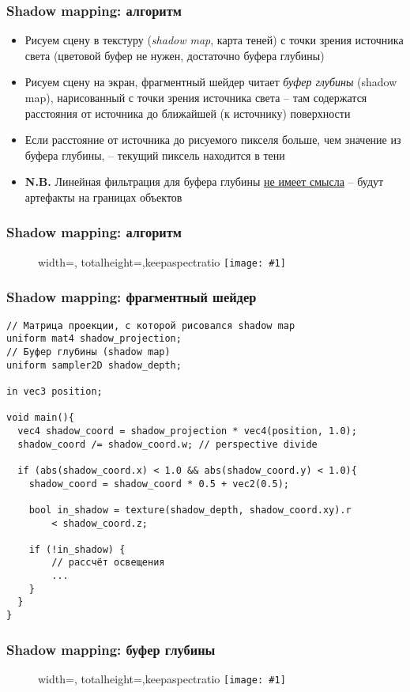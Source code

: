 \documentclass[10pt]{beamer}
\newcommand{\slideimage}[1]{
  \begin{figure}
    \begin{adjustbox}{width=\textwidth, totalheight=\textheight-2\baselineskip-2\baselineskip,keepaspectratio}
      \texttt{[image: \#1]}
    \end{adjustbox}
  \end{figure}
}
\begin{document}
\begin{frame}[fragile]
\frametitle{Shadow mapping: алгоритм}
\begin{itemize}
\item Рисуем сцену в текстуру (\textit{shadow map}, карта теней) с точки зрения источника света (цветовой буфер не нужен, достаточно буфера глубины)
\pause
\item Рисуем сцену на экран, фрагментный шейдер читает \textit{буфер глубины} (shadow map), нарисованный с точки зрения источника света -- там содержатся расстояния от источника до ближайшей (к источнику) поверхности
\item Если расстояние от источника до рисуемого пикселя больше, чем значение из буфера глубины, -- текущий пиксель находится в тени
\pause
\item \textbf{\alert{N.B.}} Линейная фильтрация для буфера глубины \underline{не имеет смысла} -- будут артефакты на границах объектов
\end{itemize}
\end{frame}

\begin{frame}[fragile]
\frametitle{Shadow mapping: алгоритм}
\slideimage{shadow-mapping1.png}
\end{frame}

\begin{frame}[fragile]
\frametitle{Shadow mapping: фрагментный шейдер}
\begin{verbatim}
// Матрица проекции, с которой рисовался shadow map
uniform mat4 shadow_projection;
// Буфер глубины (shadow map)
uniform sampler2D shadow_depth;

in vec3 position;

void main(){
  vec4 shadow_coord = shadow_projection * vec4(position, 1.0);
  shadow_coord /= shadow_coord.w; // perspective divide

  if (abs(shadow_coord.x) < 1.0 && abs(shadow_coord.y) < 1.0){
    shadow_coord = shadow_coord * 0.5 + vec2(0.5);

    bool in_shadow = texture(shadow_depth, shadow_coord.xy).r
        < shadow_coord.z;

    if (!in_shadow) {
        // рассчёт освещения
        ...
    }
  }
}
\end{verbatim}
\end{frame}

\begin{frame}[fragile]
\frametitle{Shadow mapping: буфер глубины}
\slideimage{shadow-mapping-depth.png}
\end{frame}
\end{document}
